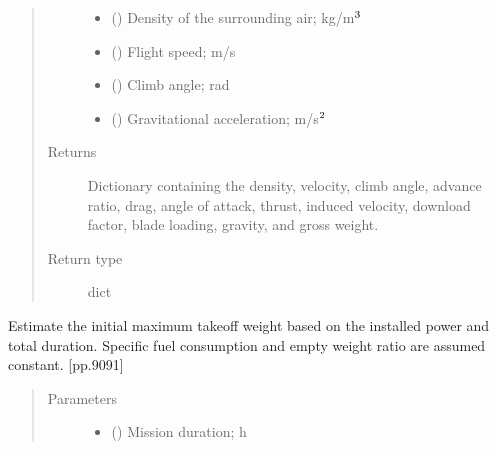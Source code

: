 \documentclass[letterpaper,10pt,english]{sphinxmanual}
\begin{document}
\begin{fulllineitems}
\begin{fulllineitems}
\begin{quote}
\begin{description}
\begin{itemize}
\item {} 
\sphinxAtStartPar
{} () \textendash{} Density of the surrounding air; kg/m\(\sp{\text{3}}\)

\item {} 
\sphinxAtStartPar
{} () \textendash{} Flight speed; m/s

\item {} 
\sphinxAtStartPar
{} () \textendash{} Climb angle; rad

\item {} 
\sphinxAtStartPar
{} () \textendash{} Gravitational acceleration; m/s\(\sp{\text{2}}\)

\end{itemize}

\item[{Returns}] \leavevmode
\sphinxAtStartPar
Dictionary containing the density, velocity, climb angle, advance
ratio, drag, angle of attack, thrust, induced velocity, download
factor, blade loading, gravity, and gross weight.

\item[{Return type}] \leavevmode
\sphinxAtStartPar
dict

\end{description}\end{quote}

\end{fulllineitems}


\begin{fulllineitems}
\label{\detokenize{modules/helicopter:helicopter.Helicopter.initial_mtow_estimation}}
\sphinxAtStartPar
Estimate the initial maximum take\sphinxhyphen{}off weight based on the installed
power and total duration. Specific fuel consumption and empty weight
ratio are assumed constant. {[}pp.90\sphinxhyphen{}91{]}
\begin{quote}\begin{description}
\item[{Parameters}] \leavevmode\begin{itemize}
\item {} 
\sphinxAtStartPar
{} () \textendash{} Mission duration; h


\end{itemize}
\end{description}
\end{quote}
\end{fulllineitems}
\end{fulllineitems}
\end{document}
